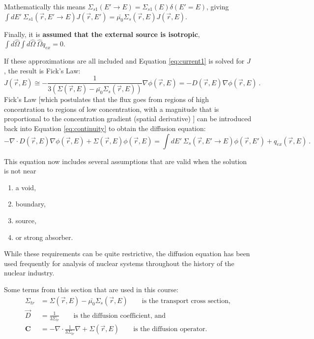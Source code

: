 \documentclass[12pt]{article}
\newcommand{\ve}[1]{\ensuremath{\mathbf{#1}}}
\newcommand{\Macro}{\ensuremath{\Sigma}}
\newcommand{\vOmega}{\ensuremath{\hat{\Omega}}}
\begin{document}
 Mathematically this means $\Macro_{s1}(E' \to E) = \Macro_{s1}(E) \delta(E' = E)$, giving $\int dE' \:\Macro_{s1}(\vec{r}, E' \to E)J(\vec{r},E') = \bar{\mu_{0}}\Macro_{s}(\vec{r},E)J(\vec{r},E)$. 
 
Finally, it is \textbf{assumed that the external source is isotropic}, $\int  d\vOmega \int d\vOmega \:\vOmega q_{ex} = 0$.

If these approximations are all included and Equation \eqref{eq:current1} is solved for $J$, the result is Fick's Law:
%
\begin{equation}
  J(\vec{r},E) \cong -\frac{1}{3(\Macro(\vec{r},E) - \bar{\mu_{0}}\Macro_{s}(\vec{r},E))} \nabla \phi (\vec{r},E) = -D(\vec{r},E) \nabla \phi (\vec{r},E) \:.
\end{equation}
%
Fick's Law [which postulates that the flux goes from regions of high concentration to regions of low concentration, with a magnitude that is proportional to the concentration gradient (spatial derivative) ] can be introduced back into Equation \eqref{eq:continuity} to obtain the diffusion equation:
%
\begin{equation}
  -\nabla \cdot D(\vec{r},E) \nabla \phi(\vec{r},E) + \Macro(\vec{r},E)\phi(\vec{r},E) = \int dE' \:\Macro_{s}(\vec{r}, E' \to E)\phi(\vec{r},E') + q_{ex}(\vec{r},E) \:.
  \label{eq:diffusion}
\end{equation}

This equation now includes several assumptions that are valid when the solution is not near
%
\begin{enumerate}
\item  a void, 
\item boundary, 
\item source, 
\item or strong absorber.
\end{enumerate} 
%
While these requirements can be quite restrictive, the diffusion equation has been used frequently for analysis of nuclear systems throughout the history of the nuclear industry.

Some terms from this section that are used in this course:
\begin{align}
  \Macro_{tr} &= \Macro(\vec{r},E) - \bar{\mu_{0}}\Macro_{s}(\vec{r},E) \qquad \text{is the transport cross section,}\\
  \vec{D} &= \frac{1}{3\Macro_{tr}} \qquad \text{is the diffusion coefficient, and}\\
  \ve{C} &= -\nabla \cdot \frac{1}{3\Macro_{tr}}\nabla+ \Macro(\vec{r},E) \qquad \text{is the diffusion operator.}
\end{align}
\end{document}
